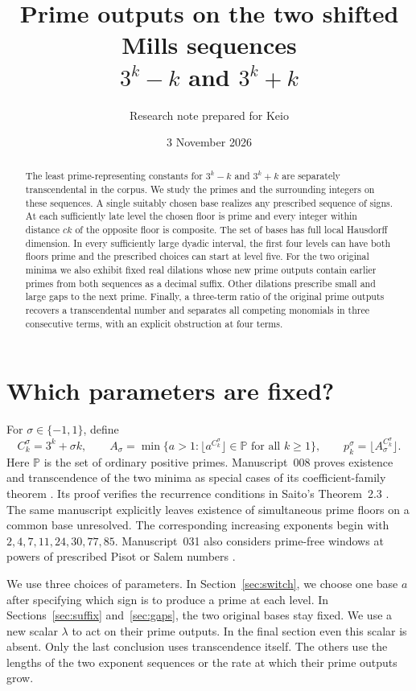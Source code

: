 \documentclass[11pt]{article}
\title{Prime outputs on the two shifted Mills sequences\\$3^k-k$ and $3^k+k$}
\author{Research note prepared for Keio}
\date{3 November 2026}
\theoremstyle{remark}\newtheorem*{remark}{Remark}
\newcommand{\PP}{\mathbb P}
\begin{document}
\maketitle
\begin{abstract}
The least prime-representing constants for $3^k-k$ and $3^k+k$
are separately transcendental in the corpus. We study the primes
and the surrounding integers on these sequences. A single suitably chosen base realizes any prescribed sequence of signs. At each
sufficiently late level the chosen floor is prime and every integer
within distance $ck$ of the opposite floor is composite. The set of bases has full local Hausdorff dimension. In every sufficiently
large dyadic interval, the first four levels can have both floors prime and
the prescribed choices can start at level five. For the two original
minima we also exhibit fixed real dilations whose new prime outputs
contain earlier primes from both sequences as a decimal suffix.
Other dilations prescribe small and large gaps to the next prime.
Finally, a three-term ratio of the original prime outputs recovers
a transcendental number and separates all competing monomials in
three consecutive terms, with an explicit obstruction at four terms.
\end{abstract}

\section{Which parameters are fixed?}
For $\sigma\in\{-1,1\}$, define
\[
 C_k^\sigma=3^k+\sigma k,\qquad
 A_\sigma=\min\{a>1:\lfloor a^{C_k^\sigma}\rfloor\in\PP
                  \text{ for all }k\ge1\},\qquad
 p_k^\sigma=\lfloor A_\sigma^{C_k^\sigma}\rfloor .
\]
Here $\PP$ is the set of ordinary positive primes. Manuscript~008 proves
existence and transcendence of the two minima as special cases of its
coefficient-family theorem \cite{corpus8}. Its proof verifies the
recurrence conditions in Saito's Theorem~2.3 \cite{saito}. The same
manuscript explicitly leaves existence of simultaneous prime floors on a common base unresolved.
The corresponding increasing exponents begin with $2,4,7,11,24,30,77,85$. Manuscript~031 also considers prime-free windows at powers of prescribed
Pisot or Salem numbers \cite{corpus31}.

We use three choices of parameters. In Section~\ref{sec:switch}, we
choose one base $a$ after specifying which sign is to produce a prime
at each level. In Sections~\ref{sec:suffix} and~\ref{sec:gaps},
the two original bases stay fixed. We use a new scalar $\lambda$
to act on their prime outputs. In the final section even this
scalar is absent. Only the last conclusion uses transcendence itself.
The others use the lengths of the two exponent sequences or the
rate at which their prime outputs grow.
\end{document}
